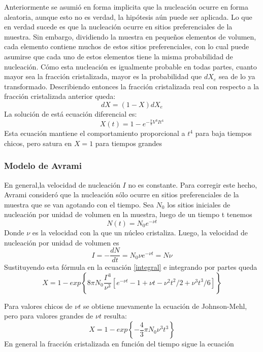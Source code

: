 \documentclass{article}
\theoremstyle{definition}
\theoremstyle{remark}
\begin{document}
Anteriormente se asumió en forma implicita que la nucleación ocurre en forma aleatoria, aunque esto no es verdad, la hipótesis aún puede ser aplicada. Lo que en verdad sucede es que la nucleación ocurre en sitios preferenciales de la muestra. Sin embargo, dividiendo la muestra en pequeños elementos de volumen, cada elemento contiene muchos de estos sitios preferenciales, con lo cual puede asumirse que cada uno de estos elementos tiene la misma probabilidad de nucleación. Cómo esta nucleación es igualmente probable en todas partes, cuanto mayor sea la fracción cristalizada, mayor es la probabilidad que $dX_e$ sea de lo ya transformado. Describiendo entonces la fracción cristalizada real con respecto a la fracción cristalizada anterior queda:
\begin{equation}
 dX = (1 - X)dX_e
\end{equation}
La solución de está ecuación diferencial es:
\begin{equation}
	X(t)=1-e^{-\frac{\pi}{3}V^3 I t^4}
\end{equation}
Esta ecuación mantiene el comportamiento proporcional a $t^4$ para baja tiempos chicos, pero satura en $X = 1$ para tiempos grandes

\subsubsection{Modelo de Avrami}
En general,la velocidad de nucleación $I$ no es constante. Para corregir este hecho, Avrami consideró que la nucleación sólo ocurre en sitios preferenciales de la muestra que se van agotando con el tiempo. Sea $N_0$ los sitios iniciales de nucleación por unidad de volumen en la muestra, luego de un tiempo t tenemos
\begin{equation}
	N(t) = N_0e^{-\nu t}
\end{equation}
Donde $\nu$ es la velocidad con la que un núcleo cristaliza. Luego, la velocidad de nucleación por unidad de volumen es 
\begin{equation}
	I = -\frac{dN}{dt} = N_0\nu e^{-\nu t} = N\nu
\end{equation}
Sustituyendo esta fórmula en la ecuación \ref{integral} e integrando por partes queda
\begin{equation}
	X = 1-exp \left\lbrace 8\pi N_0\frac{\Gamma^3}{\nu^3} \left[ e^{-\nu t} -1+\nu t -\nu^2t^2/2 + \nu^3 t^3/6 \right] \right\rbrace
\end{equation}

Para valores chicos de $\nu t$ se obtiene nuevamente la ecuación de Johnson-Mehl, pero para valores grandes de $\nu t$ resulta:
\begin{equation}
	X = 1 - exp\left\lbrace -\frac{4}{3} \pi N_0 \nu^3 t^3 \right\rbrace
\end{equation}
En general la fracción cristalizada en función del tiempo sigue la ecuación
\end{document}
